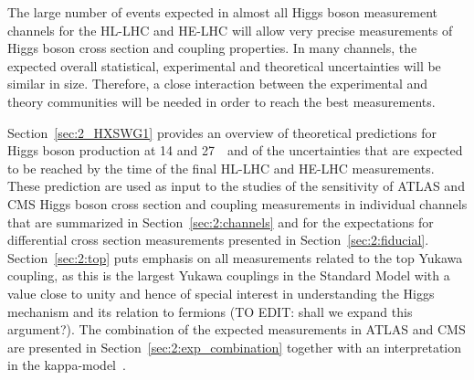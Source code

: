 The large number of events expected in almost all Higgs boson measurement channels for the HL-LHC and HE-LHC will allow very precise measurements of Higgs boson cross section and coupling properties. In many channels, the expected overall statistical, experimental and theoretical uncertainties will be similar in size. Therefore, a close interaction between the experimental and theory communities will be needed in order to reach the best measurements.

Section~\ref{sec:2_HXSWG1} provides an overview of theoretical predictions for Higgs boson production at 14 and 27~\UTeV\ and of the uncertainties that are expected to be reached by the time of the final HL-LHC and HE-LHC measurements. 
These prediction are used as input to the studies of the sensitivity of ATLAS and CMS Higgs boson cross section and coupling measurements in individual channels that are summarized in Section~\ref{sec:2:channels} and for the expectations for differential cross section measurements presented in Section~\ref{sec:2:fiducial}.
Section~\ref{sec:2:top} puts emphasis on all measurements related to the top Yukawa coupling, as this is the largest Yukawa couplings in the Standard Model with a value close to unity and hence of special interest in understanding the Higgs mechanism and its relation to fermions (TO EDIT: shall we expand this argument?).
The combination of the expected measurements in ATLAS and CMS are presented in Section~\ref{sec:2:exp_combination} together with an interpretation in the kappa-model~\cite{LHCHiggsCrossSectionWorkingGroup:2012nn,Heinemeyer:2013tqa}.